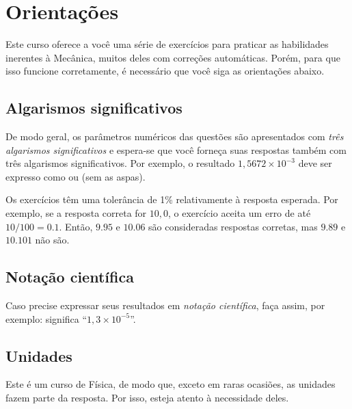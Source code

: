 \section*{Orientações}
	Este curso oferece a você uma série de exercícios para praticar as habilidades inerentes à Mecânica, muitos deles com correções automáticas. Porém, para que isso funcione corretamente, é necessário que você siga as orientações abaixo.

\subsection*{Algarismos significativos}

	De modo geral, os parâmetros numéricos das questões são apresentados com \emph{três algarismos significativos} e espera-se que você forneça suas respostas também com três algarismos significativos.
	Por exemplo, o resultado $1,5672\times10^{-3}$ deve ser expresso como  ou  (sem as aspas).

	Os exercícios têm uma tolerância de 1\% relativamente à resposta esperada.
	Por exemplo, se a resposta correta for $10,0$, o exercício aceita um erro de até $10/100 = 0.1$.
	Então, $9.95$ e $10.06$ são consideradas respostas corretas, mas $9.89$ e $10.101$ não são.

\subsection*{Notação científica}

	Caso precise expressar seus resultados em \emph{notação científica}, faça assim, por exemplo:  significa ``$1,3\times 10^{-5}$''.

\subsection*{Unidades}

	Este é um curso de Física, de modo que, exceto em raras ocasiões, as unidades fazem parte da resposta.
	Por isso, esteja atento à necessidade deles.

